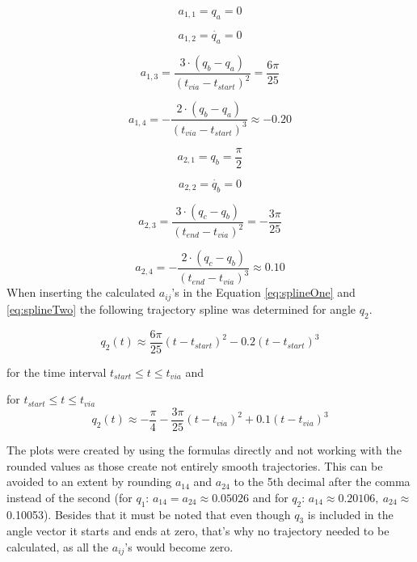 \begin{equation}
a_{1,1}=q_a = 0
\end{equation}

\begin{equation}
a_{1,2}=\dot{q_a} = 0
\end{equation}

\begin{equation}
a_{1,3}=\frac{3\cdot(q_b-q_a)}{(t_{via}-t_{start})^2} = \frac{6\pi}{25}
\end{equation}

\begin{equation}
a_{1,4}=-\frac{2\cdot(q_b-q_a)}{(t_{via}-t_{start})^3} \approx -0.20
\end{equation}

\begin{equation}
a_{2,1}=q_b = \frac{\pi}{2}
\end{equation}

\begin{equation}
a_{2,2}=\dot{q_b} = 0
\end{equation}

\begin{equation}
a_{2,3}=\frac{3\cdot(q_c-q_b)}{(t_{end}-t_{via})^2} = -\frac{3\pi}{25}
\end{equation}

\begin{equation}
a_{2,4}=-\frac{2\cdot(q_c-q_b)}{(t_{end}-t_{via})^3} \approx 0.10
\end{equation}
\newpage
When inserting the calculated $a_{ij}$'s in the Equation \ref{eq:splineOne} and \ref{eq:splineTwo} the following trajectory spline was determined
for angle $q_2$. 


\begin{equation}
    q_2(t) \approx \frac{6\pi}{25}  (t-t_{start})^2  - 0.2(t-t_{start})^3
\end{equation}

for the time interval $ t_{start} \leq t \leq t_{via}$ and 

for $ t_{start} \leq t \leq t_{via}$
\begin{equation}
   q_2(t) \approx -\frac{\pi}{4} -\frac{3\pi}{25}  (t-t_{via})^2 + 0.1 (t-t_{via})^3
   \label{eq:splineTwoooooo}
\end{equation}

The plots were created by using the formulas directly and not working with the rounded values as those create not entirely smooth trajectories. This can be avoided to an extent by rounding $a_{14}$ and $a_{24}$ to the 5th decimal after the comma instead of the second (for $q_1$: $a_{14}= a_{24} \approx 0.05026$ and for $q_2$:  $a_{14}\approx 0.20106, \ a_{24} \approx$  0.10053). Besides that it must be noted that even though $q_3$ is included in the angle vector it starts and ends at zero, that's why no trajectory needed to be calculated, as all the $a_{ij}$'s would become zero.



